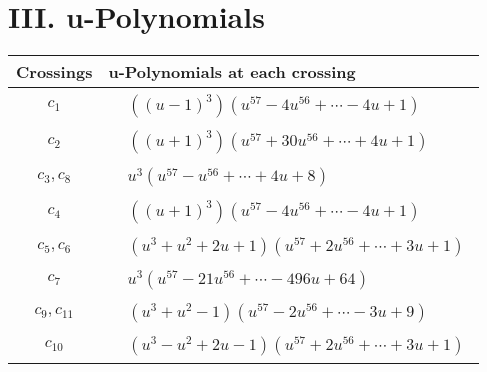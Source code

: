 \documentclass[1p]{elsarticle_modified}
\theoremstyle{definition}
\begin{document}
\newpage\renewcommand{\arraystretch}{1}
\centering \section*{ III. u-Polynomials}
\begin{tabular}{m{50pt}|m{274pt}}
Crossings & \hspace{64pt}u-Polynomials at each crossing \\
\hline $$\begin{aligned}c_{1}\end{aligned}$$&$\begin{aligned}
&((u-1)^3)(u^{57}-4 u^{56}+\cdots-4 u+1)
\end{aligned}$\\
\hline $$\begin{aligned}c_{2}\end{aligned}$$&$\begin{aligned}
&((u+1)^3)(u^{57}+30 u^{56}+\cdots+4 u+1)
\end{aligned}$\\
\hline $$\begin{aligned}c_{3},c_{8}\end{aligned}$$&$\begin{aligned}
&u^3(u^{57}- u^{56}+\cdots+4 u+8)
\end{aligned}$\\
\hline $$\begin{aligned}c_{4}\end{aligned}$$&$\begin{aligned}
&((u+1)^3)(u^{57}-4 u^{56}+\cdots-4 u+1)
\end{aligned}$\\
\hline $$\begin{aligned}c_{5},c_{6}\end{aligned}$$&$\begin{aligned}
&(u^3+u^2+2 u+1)(u^{57}+2 u^{56}+\cdots+3 u+1)
\end{aligned}$\\
\hline $$\begin{aligned}c_{7}\end{aligned}$$&$\begin{aligned}
&u^3(u^{57}-21 u^{56}+\cdots-496 u+64)
\end{aligned}$\\
\hline $$\begin{aligned}c_{9},c_{11}\end{aligned}$$&$\begin{aligned}
&(u^3+u^2-1)(u^{57}-2 u^{56}+\cdots-3 u+9)
\end{aligned}$\\
\hline $$\begin{aligned}c_{10}\end{aligned}$$&$\begin{aligned}
&(u^3- u^2+2 u-1)(u^{57}+2 u^{56}+\cdots+3 u+1)
\end{aligned}$\\
\hline
\end{tabular}\newpage\renewcommand{\arraystretch}{1}
\end{document}
